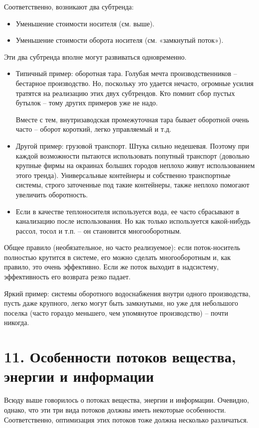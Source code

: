 \documentclass[a4paper,11pt]{article}
\begin{document}
Соответственно, возникают два субтренда:
\begin{itemize}
\item Уменьшение стоимости носителя (см. выше).
\item Уменьшение стоимости оборота носителя (см. «замкнутый поток»).
\end{itemize}
Эти два субтренда вполне могут развиваться одновременно.
\begin{itemize}
\item Типичный пример: оборотная тара. Голубая мечта производственников --
  бестарное производство. Но, поскольку это удается нечасто, огромные усилия
  тратятся на реализацию этих двух субтрендов. Кто помнит сбор пустых бутылок
  -- тому других примеров уже не надо.

  Вместе с тем, внутризаводская промежуточная тара бывает оборотной очень
  часто -- оборот короткий, легко управляемый и т.д.

\item Другой пример: грузовой транспорт. Штука сильно недешевая. Поэтому при
  каждой возможности пытаются использовать попутный транспорт (довольно
  крупные фирмы на окраинах больших городов неплохо живут использованием этого
  тренда). Универсальные контейнеры и собственно транспортные системы, строго
  заточенные под такие контейнеры, также неплохо помогают увеличить
  оборотность.
  
\item Если в качестве теплоносителя используется вода, ее часто сбрасывают в
  канализацию после использования. Но как только используется какой-нибудь
  рассол, тосол и т.п. -- он становится многооборотным.
\end{itemize}
Общее правило (необязательное, но часто реализуемое): если поток-носитель
полностью крутится в системе, его можно сделать многооборотным и, как правило,
это очень эффективно. Если же поток выходит в надсистему, эффективность его
возврата резко падает.

Яркий пример: системы оборотного водоснабжения внутри одного производства,
пусть даже крупного, легко могут быть замкнутыми, но уже для небольшого
поселка (часто гораздо меньшего, чем упомянутое производство) -- почти никогда.

\section{11. Особенности потоков вещества, энергии и информации}

Всюду выше говорилось о потоках вещества, энергии и информации. Очевидно,
однако, что эти три вида потоков должны иметь некоторые особенности.
Соответственно, оптимизация этих потоков тоже должна несколько различаться.
\end{document}
